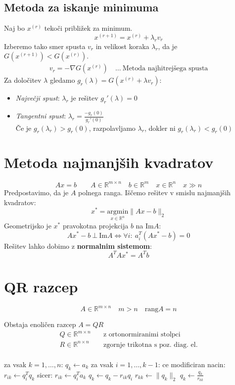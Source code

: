 \begin{multicols}{5}
\subsection{Metoda za iskanje minimuma}
Naj bo $x^{(r)}$ tekoči približek za minimum.
\[ x^{(r+1)} = x^{(r)} + \lambda_r v_r\]
Izberemo tako smer spusta $v_r$ in velikost koraka $\lambda_r$, da je $G(x^{(r+1)}) < G(x^{(r)})$.
\begin{align*}
	v_r = - \nabla G(x^{(r)}) & \ \dots \ \text{Metoda najhitrejšega spusta}
\end{align*} 
Za določitev $\lambda$ gledamo $g_r(\lambda) = G(x^{(r)} + \lambda v_r)$:
\begin{itemize}
	\item \textit{Največji spust}: $\lambda_r$ je rešitev $g_r'(\lambda) = 0$
	\item \textit{Tangentni spust}: $\lambda_r = \frac{-g_r(0)}{g_r'(0)}$ \\
	Če je $g_r(\lambda_r) > g_r(0)$, razpolavljamo $\lambda_r$, dokler ni $g_r(\lambda_r) < g_r(0)$
\end{itemize}

\section{Metoda najmanjših kvadratov}
\[ A x = b \qquad A \in \mathbb{R}^{m \times n} \quad b \in \mathbb{R}^m \quad x \in \mathbb{R}^n \quad x \gg n\]
Predpostavimo, da je $A$ polnega ranga.
Iščemo rešitev v smislu najmanjših kvadratov:
\[ x^* = \underset{x \in \mathbb{R}^n}{\mathrm{argmin}} \| Ax - b \|_2 \]
Geometrijsko je $x^*$ pravokotna projekcija $b$ na $\text{Im}A$:
\[Ax^* - b\ \bot \ \text{Im}A \iff \forall i:\ a_i^T (Ax^* - b) = 0\]
Rešitev lahko dobimo z \textbf{normalnim sistemom}:
\[ A^T A x^* = A^T b \]

\section{QR razcep}
\[ A \in \mathbb{R}^{m\times n} \quad m > n \quad \text{rang}A = n \]

Obstaja enoličen razcep $A = QR$
\begin{align*}
	Q \in \mathbb{R}^{m\times n} \quad &\text{z ortonormiranimi stolpci} \\
	R \in \mathbb{R}^{n\times n} \quad &\text{zgornje trikotna s poz. diag. el.} \\
\end{align*}

\begin{koda}
za vsak $k = 1, \dots, n$:
	$q_k \leftarrow a_k$
	za vsak $i = 1, \dots, k-1$:
		ce modificiran nacin:
			$r_{ik} \leftarrow q_i^T q_k$
		sicer:
			$r_{ik} \leftarrow q_i^T a_k$
		$q_k \leftarrow q_k - r_{ik} q_i$
	$r_{kk} \leftarrow \| q_k \|_2$
	$q_k \leftarrow \frac{q_k}{r_{kk}}$
\end{koda}


\end{multicols}
